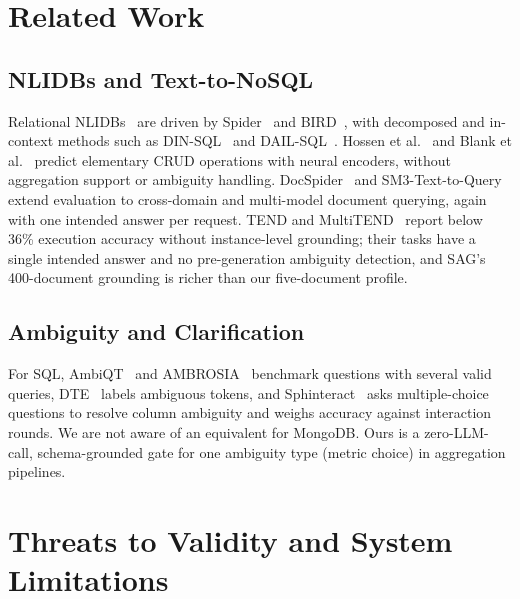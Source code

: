 \section{Related Work}
\label{sec:related}

\subsection{NLIDBs and Text-to-NoSQL}
Relational NLIDBs~\cite{quamar2022nli,ozcan2020nli} are driven by Spider~\cite{spider2018} and BIRD~\cite{bird2023}, with decomposed and in-context methods such as DIN-SQL~\cite{dinsql2023} and DAIL-SQL~\cite{dailsql2023}. Hossen et al.~\cite{hossen2023bert} and Blank et al.~\cite{blank2019nosql} predict elementary CRUD operations with neural encoders, without aggregation support or ambiguity handling. DocSpider~\cite{docspider2025} and SM3-Text-to-Query~\cite{sm3text2024} extend evaluation to cross-domain and multi-model document querying, again with one intended answer per request. TEND and MultiTEND~\cite{tend2025benchmark,multitend2025} report below 36\% execution accuracy without instance-level grounding; their tasks have a single intended answer and no pre-generation ambiguity detection, and SAG's 400-document grounding is richer than our five-document profile.

\subsection{Ambiguity and Clarification}
For SQL, AmbiQT~\cite{bhaskar2023ambiqt} and AMBROSIA~\cite{saparina2024ambrosia} benchmark questions with several valid queries, DTE~\cite{wang2023dte} labels ambiguous tokens, and Sphinteract~\cite{zhao2025sphinteract} asks multiple-choice questions to resolve column ambiguity and weighs accuracy against interaction rounds. We are not aware of an equivalent for MongoDB. Ours is a zero-LLM-call, schema-grounded gate for one ambiguity type (metric choice) in aggregation pipelines.

\section{Threats to Validity and System Limitations}
\label{sec:limitations}


